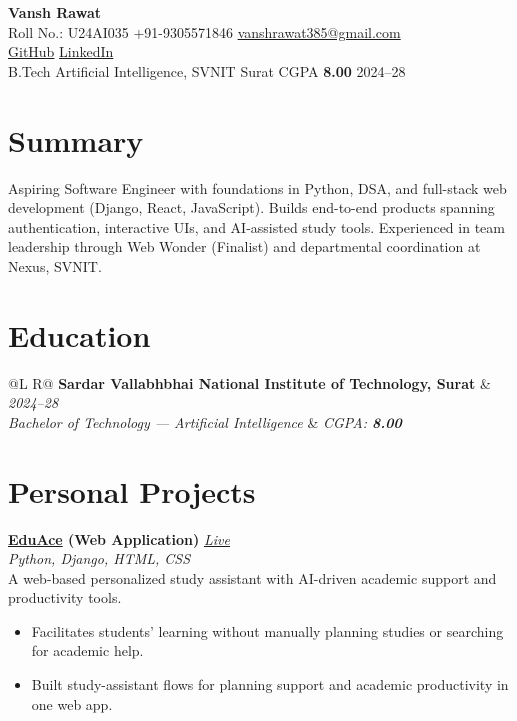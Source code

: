 \documentclass[a4paper,10pt]{article}
\makeatletter
\newcommand{\entry}[4]{%
  \vspace{0.6mm}
  \noindent\begin{tabularx}{\textwidth}{@{}L R@{}}
    \textbf{#1} & \textit{\small #2} \\
    \textit{\small #3} & \textit{\small #4} \\
  \end{tabularx}\par
}
\makeatother
\begin{document}
\selectfont

\begin{center}
  {\LARGE \textbf{Vansh Rawat}} \\[1.2mm]
  \small
  Roll No.: U24AI035 \textbar{}
  +91-9305571846 \textbar{}
  \href{mailto:vanshrawat385@gmail.com}{vanshrawat385@gmail.com} \\[0.4mm]
  \href{https://github.com/Vansh-ai406/}{GitHub} \textbar{}
  \href{https://www.linkedin.com/in/vansh-rawat-020612337/}{LinkedIn} \\[0.4mm]
  B.Tech Artificial Intelligence, SVNIT Surat \textbar{} CGPA \textbf{8.00} \textbar{} 2024--28
\end{center}

\section{Summary}
\noindent\small
Aspiring Software Engineer with foundations in Python, DSA, and full-stack web development (Django, React, JavaScript).
Builds end-to-end products spanning authentication, interactive UIs, and AI-assisted study tools.
Experienced in team leadership through Web Wonder (Finalist) and departmental coordination at Nexus, SVNIT.

\section{Education}
\entry{Sardar Vallabhbhai National Institute of Technology, Surat}{2024--28}
{Bachelor of Technology --- Artificial Intelligence}{CGPA: \textbf{8.00}}

\section{Personal Projects}
\vspace{0.8mm}
\noindent\textbf{\href{https://eduace.onrender.com/}{EduAce} (Web Application)}
\hfill \href{https://eduace.onrender.com/}{\textit{\small Live}}\\
\textit{\small Python, Django, HTML, CSS}\\[0.5mm]
A web-based personalized study assistant with AI-driven academic support and productivity tools.
\begin{itemize}
  \item Facilitates students' learning without manually planning studies or searching for academic help.
  \item Built study-assistant flows for planning support and academic productivity in one web app.
\end{itemize}
\end{document}
